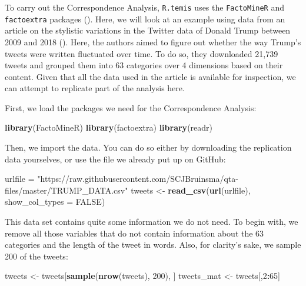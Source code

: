 \documentclass[
]{book}
\newenvironment{Shaded}{\begin{snugshade}}{\end{snugshade}}
\newcommand{\AttributeTok}[1]{\textcolor[rgb]{0.13,0.29,0.53}{#1}}
\newcommand{\ConstantTok}[1]{\textcolor[rgb]{0.56,0.35,0.01}{#1}}
\newcommand{\DecValTok}[1]{\textcolor[rgb]{0.00,0.00,0.81}{#1}}
\newcommand{\FunctionTok}[1]{\textcolor[rgb]{0.13,0.29,0.53}{\textbf{#1}}}
\newcommand{\NormalTok}[1]{#1}
\newcommand{\OtherTok}[1]{\textcolor[rgb]{0.56,0.35,0.01}{#1}}
\newcommand{\SpecialCharTok}[1]{\textcolor[rgb]{0.81,0.36,0.00}{\textbf{#1}}}
\newcommand{\StringTok}[1]{\textcolor[rgb]{0.31,0.60,0.02}{#1}}
\begin{document}
To carry out the Correspondence Analysis, \texttt{R.temis} uses the \texttt{FactoMineR} and \texttt{factoextra} packages (). Here, we will look at an example using data from an article on the stylistic variations in the Twitter data of Donald Trump between 2009 and 2018 (). Here, the authors aimed to figure out whether the way Trump's tweets were written fluctuated over time. To do so, they downloaded 21,739 tweets and grouped them into 63 categories over 4 dimensions based on their content. Given that all the data used in the article is available for inspection, we can attempt to replicate part of the analysis here.

First, we load the packages we need for the Correspondence Analysis:

\begin{Shaded}
\begin{Highlighting}[]
\FunctionTok{library}\NormalTok{(FactoMineR)}
\FunctionTok{library}\NormalTok{(factoextra)}
\FunctionTok{library}\NormalTok{(readr)}
\end{Highlighting}
\end{Shaded}

Then, we import the data. You can do so either by downloading the replication data yourselves, or use the file we already put up on GitHub:

\begin{Shaded}
\begin{Highlighting}[]
\NormalTok{urlfile }\OtherTok{=} \StringTok{"https://raw.githubusercontent.com/SCJBruinsma/qta{-}files/master/TRUMP\_DATA.csv"}
\NormalTok{tweets }\OtherTok{\textless{}{-}} \FunctionTok{read\_csv}\NormalTok{(}\FunctionTok{url}\NormalTok{(urlfile), }\AttributeTok{show\_col\_types =} \ConstantTok{FALSE}\NormalTok{)}
\end{Highlighting}
\end{Shaded}

This data set contains quite some information we do not need. To begin with, we remove all those variables that do not contain information about the 63 categories and the length of the tweet in words. Also, for clarity's sake, we sample 200 of the tweets:

\begin{Shaded}
\begin{Highlighting}[]
\NormalTok{tweets }\OtherTok{\textless{}{-}}\NormalTok{ tweets[}\FunctionTok{sample}\NormalTok{(}\FunctionTok{nrow}\NormalTok{(tweets), }\DecValTok{200}\NormalTok{), ]}
\NormalTok{tweets\_mat }\OtherTok{\textless{}{-}}\NormalTok{ tweets[,}\DecValTok{2}\SpecialCharTok{:}\DecValTok{65}\NormalTok{]}
\end{Highlighting}
\end{Shaded}
\end{document}
